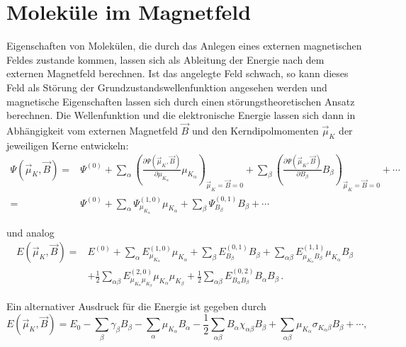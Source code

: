 \section{Moleküle im Magnetfeld}\label{kap:magnetfeld}

Eigenschaften von Molekülen, die durch das Anlegen eines externen magnetischen Feldes zustande kommen, lassen sich als Ableitung der Energie nach dem externen Magnetfeld berechnen. Ist das angelegte Feld schwach, so kann dieses Feld als Störung der Grundzustandswellenfunktion angesehen werden und magnetische Eigenschaften lassen sich durch einen störungstheoretischen Ansatz berechnen. Die Wellenfunktion und die elektronische Energie lassen sich dann in Abhängigkeit vom externen Magnetfeld $\vec{B}$ und den Kerndipolmomenten $\vec{\mu}_K$ der jeweiligen Kerne entwickeln:\supercite{ditchfield1974self} 
\begingroup
\small
\begin{equation}
\begin{aligned}
\Psi(\vec{\mu}_K,\vec{B})=&\Psi^{(0)}+\sum_{\alpha}\left(\frac{\partial\Psi(\vec{\mu}_K,\vec{B})}{\partial \mu_{K_\alpha}}\mu_{K_\alpha}\right)_{\vec{\mu}_K=\vec{B}=0}+\sum_\beta\left(\frac{\partial\Psi(\vec{\mu}_K,\vec{B})}{\partial B_\beta}B_\beta\right)_{\vec{\mu}_K=\vec{B}=0}+\cdots\\
=&\Psi^{(0)}+\sum_{\alpha}\Psi_{\mu_{K_\alpha}}^{(1,0)}\mu_{K_\alpha}+\sum_\beta\Psi_{B_\beta}^{(0,1)}B_\beta+\cdots
\end{aligned}
\end{equation}
\endgroup

und analog
\begin{equation}\label{eq:evonbmu0}
\begin{aligned}
E(\vec{\mu}_K,\vec{B})=&E^{(0)}+\sum_{\alpha} E^{(1,0)}_{\mu_{K_\alpha}} \mu_{K_\alpha}+\sum_\beta E^{(0,1)}_{B_\beta} B_\beta+\sum_{\alpha\beta} E^{(1,1)}_{\mu_{K_\alpha}B_\beta} \mu_{K_\alpha}B_\beta\\
&+\frac{1}{2}\sum_{\alpha\beta} E^{(2,0)}_{\mu_{K_\alpha}\mu_{K_\beta}}\mu_{K_\alpha}\mu_{K_\beta}+\frac{1}{2}\sum_{\alpha\beta} E^{(0,2)}_{B_\alpha B_\beta}B_\alpha B_\beta\, .
\end{aligned}
\end{equation}

Ein alternativer Ausdruck für die Energie ist gegeben durch
\begin{equation}\label{eq:evonbmu}
 E(\vec{\mu}_K,\vec{B})=E_0-\sum_\beta \gamma_\beta B_\beta-\sum_{\alpha}\mu_{K_\alpha}B_\alpha-\frac{1}{2}\sum_{\alpha\beta}B_\alpha\chi_{\alpha\beta} B_\beta+\sum_{\alpha\beta}\mu_{K_\alpha}\sigma_{K_\alpha \beta}B_\beta+\cdots, 
\end{equation}

